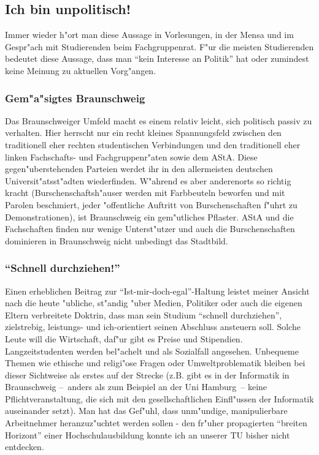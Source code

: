 \subsection{Ich bin unpolitisch!}

Immer wieder h"ort man diese Aussage in Vorlesungen, in der Mensa und im 
Gespr"ach mit Studierenden beim Fachgruppenrat. F"ur die meisten Studierenden 
bedeutet diese Aussage, dass man "`kein Interesse an Politik"' hat oder 
zumindest keine Meinung zu aktuellen Vorg"angen.

\subsubsection*{Gem"a"sigtes Braunschweig}

Das Braunschweiger Umfeld macht es einem relativ leicht, sich politisch passiv 
zu verhalten. Hier herrscht nur ein recht kleines Spannungsfeld zwischen den 
traditionell eher rechten studentischen Verbindungen und den traditionell eher 
linken Fachschafts- und Fachgruppenr"aten sowie dem AStA. Diese 
gegen"uberstehenden Parteien werdet ihr in den allermeisten deutschen 
Universit"atsst"adten wiederfinden. W"ahrend es aber anderenorts so richtig 
kracht (Burschenschaftsh"auser werden mit Farbbeuteln beworfen und mit Parolen 
beschmiert, jeder "offentliche Auftritt von Burschenschaften f"uhrt zu 
Demonstrationen), ist Braunschweig ein gem"utliches Pflaster. AStA und die 
Fachschaften finden nur wenige Unterst"utzer und auch die Burschenschaften 
dominieren in Braunschweig nicht unbedingt das Stadtbild.

\subsubsection*{"`Schnell durchziehen!"'}

Einen erheblichen Beitrag zur "`Ist-mir-doch-egal"'-Haltung leistet meiner 
Ansicht nach die heute "ubliche, st"andig "uber Medien, Politiker oder auch die 
eigenen Eltern verbreitete Doktrin, dass man sein Studium "`schnell 
durchziehen"', zielstrebig, leistungs- und ich-orientiert seinen Abschluss 
ansteuern soll. Solche Leute will die Wirtschaft, daf"ur gibt es Preise und 
Stipendien. Langzeitstudenten werden bel"achelt und als Sozialfall angesehen. 
Unbequeme Themen wie ethische und religi"ose Fragen oder Umweltproblematik 
bleiben bei dieser Sichtweise als erstes auf der Strecke (z.B. gibt es in der 
Informatik in Braunschweig --~anders als zum Beispiel an der Uni Hamburg~-- 
keine Pflichtveranstaltung, die sich mit den gesellschaftlichen Einfl"ussen der 
Informatik auseinander setzt). Man hat das Gef"uhl, dass unm"undige, 
manipulierbare Arbeitnehmer heranzuz"uchtet werden sollen - den fr"uher 
propagierten "`breiten Horizont"' einer Hochschulausbildung konnte ich an 
unserer TU bisher nicht entdecken.

